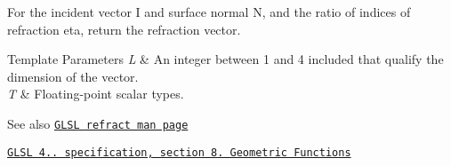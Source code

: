 For the incident vector I and surface normal N, and the ratio of indices of refraction eta, return the refraction vector.


\begin{DoxyTemplParams}{Template Parameters}
{\em L} & An integer between 1 and 4 included that qualify the dimension of the vector. \\
\hline
{\em T} & Floating-\/point scalar types.\\
\hline
\end{DoxyTemplParams}
\begin{DoxySeeAlso}{See also}
\href{http://www.opengl.org/sdk/docs/manglsl/xhtml/refract.xml}{\tt G\+L\+SL refract man page} 

\href{http://www.opengl.org/registry/doc/GLSLangSpec.4.20.8.pdf}{\tt G\+L\+SL 4.. specification, section 8. Geometric Functions} 
\end{DoxySeeAlso}
